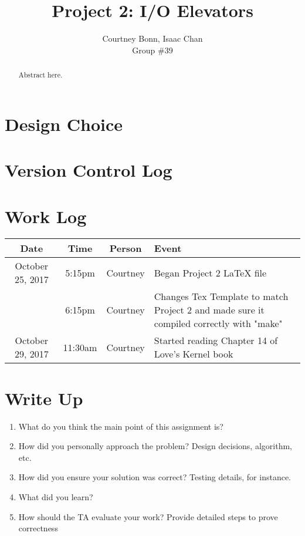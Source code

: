 \documentclass[letterpaper,10pt,draftclsnofoot,onecolumn,titlepage]{IEEEtran}
\def\name{Courtney Bonn, Isaac Chan}
\def\grp{Group \#39}
\begin{document}
\title{Project 2: I/O Elevators}
\author{\name \\ \grp}

\maketitle

\begin{abstract}
Abstract here.
\end{abstract}

\clearpage
\section{Design Choice}
    
\section{Version Control Log}
%

\section{Work Log}
\begin{center}
\begin{tabular}{ c c c l }
 Date  & Time & Person & Event \\ \hline
October 25, 2017 & 5:15pm & Courtney & Began Project 2 LaTeX file \\
		 & 6:15pm & Courtney & Changes Tex Template to match Project 2 and made sure it compiled correctly with "make" \\
October 29, 2017 & 11:30am & Courtney & Started reading Chapter 14 of Love's Kernel book \\                 
\end{tabular}
\end{center}

\section{Write Up}
\begin{enumerate}
                \item What do you think the main point of this assignment is?
                \item How did you personally approach the problem? Design decisions, algorithm, etc.
                \item How did you ensure your solution was correct? Testing details, for instance.
                \item What did you learn?
                \item How should the TA evaluate your work? Provide detailed steps to prove correctness 
\end{enumerate}
\end{document}
